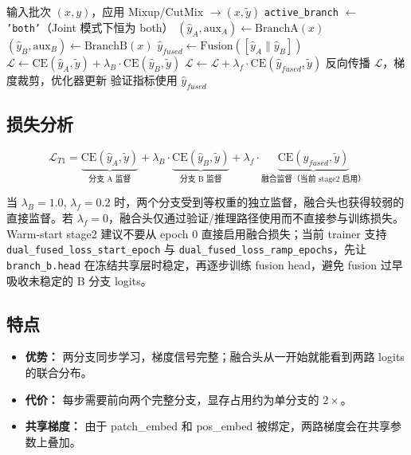 \documentclass[a4paper,11pt]{article}
\begin{document}
\begin{algorithm}[h]
\caption{T1 Joint 联合训练 — 单个 Step}
\begin{algorithmic}[1]
\STATE 输入批次 $(x, y)$，应用 Mixup/CutMix $\rightarrow (x, \tilde{y})$
\STATE \texttt{active\_branch} $\leftarrow$ \texttt{'both'}（Joint 模式下恒为 both）
\STATE $(\hat{y}_A, \text{aux}_A) \leftarrow \text{BranchA}(x)$
\STATE $(\hat{y}_B, \text{aux}_B) \leftarrow \text{BranchB}(x)$
\STATE $\hat{y}_{fused} \leftarrow \text{Fusion}([\hat{y}_A \| \hat{y}_B])$
\STATE $\mathcal{L} \leftarrow \text{CE}(\hat{y}_A, \tilde{y}) + \lambda_B \cdot \text{CE}(\hat{y}_B, \tilde{y})$
    \STATE $\mathcal{L} \leftarrow \mathcal{L} + \lambda_f \cdot \text{CE}(\hat{y}_{fused}, \tilde{y})$
\ENDIF
\STATE 反向传播 $\mathcal{L}$，梯度裁剪，优化器更新
\STATE 验证指标使用 $\hat{y}_{fused}$
\end{algorithmic}
\end{algorithm}

\subsection{损失分析}

\[
    \mathcal{L}_{T1} = \underbrace{\text{CE}(\hat{y}_A, \tilde{y})}_{\text{分支 A 监督}} + \lambda_B \cdot \underbrace{\text{CE}(\hat{y}_B, \tilde{y})}_{\text{分支 B 监督}} + \lambda_f \cdot \underbrace{\text{CE}(\hat{y}_{fused}, \tilde{y})}_{\text{融合监督（当前 stage2 启用）}}
\]

当 $\lambda_B=1.0$, $\lambda_f=0.2$ 时，两个分支受到等权重的独立监督，融合头也获得较弱的直接监督。若 $\lambda_f=0$，融合头仅通过验证/推理路径使用而不直接参与训练损失。
Warm-start stage2 建议不要从 epoch 0 直接启用融合损失；当前 trainer 支持 \texttt{dual\_fused\_loss\_start\_epoch} 与 \texttt{dual\_fused\_loss\_ramp\_epochs}，先让 \texttt{branch\_b.head} 在冻结共享层时稳定，再逐步训练 fusion head，避免 fusion 过早吸收未稳定的 B 分支 logits。

\subsection{特点}

\begin{itemize}
    \item \textbf{优势：} 两分支同步学习，梯度信号完整；融合头从一开始就能看到两路 logits 的联合分布。
    \item \textbf{代价：} 每步需要前向两个完整分支，显存占用约为单分支的 $2\times$。
    \item \textbf{共享梯度：} 由于 patch\_embed 和 pos\_embed 被绑定，两路梯度会在共享参数上叠加。
\end{itemize}
\end{document}
